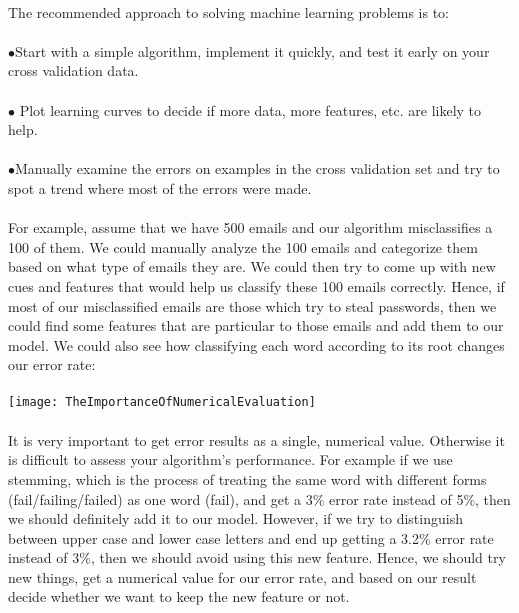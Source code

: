 \documentclass[UTF8]{ctexart}
\begin{document}
\paragraph{}
The recommended approach to solving machine learning problems is to:
\paragraph{}
$\bullet$Start with a simple algorithm, implement it quickly, and test it early on your cross validation data.
\paragraph{}
$\bullet$ Plot learning curves to decide if more data, more features, etc. are likely to help.
\paragraph{}
$\bullet$Manually examine the errors on examples in the cross validation set and try to spot a trend where most of the errors were made.
\paragraph{}
For example, assume that we have 500 emails and our algorithm misclassifies a 100 of them. We could manually analyze the 100 emails and categorize them based on what type of emails they are. We could then try to come up with new cues and features that would help us classify these 100 emails correctly. Hence, if most of our misclassified emails are those which try to steal passwords, then we could find some features that are particular to those emails and add them to our model. We could also see how classifying each word according to its root changes our error rate:
\paragraph{}
\texttt{[image: TheImportanceOfNumericalEvaluation]}
\paragraph{}
It is very important to get error results as a single, numerical value. Otherwise it is difficult to assess your algorithm's performance. For example if we use stemming, which is the process of treating the same word with different forms (fail/failing/failed) as one word (fail), and get a 3\% error rate instead of 5\%, then we should definitely add it to our model. However, if we try to distinguish between upper case and lower case letters and end up getting a 3.2\% error rate instead of 3\%, then we should avoid using this new feature. Hence, we should try new things, get a numerical value for our error rate, and based on our result decide whether we want to keep the new feature or not.
\end{document}
